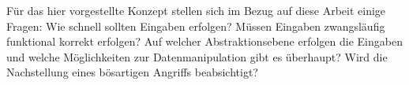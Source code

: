Für das hier vorgestellte Konzept stellen sich im Bezug auf diese Arbeit einige Fragen:
Wie schnell sollten Eingaben erfolgen? Müssen Eingaben zwangsläufig funktional korrekt erfolgen?
Auf welcher Abstraktionsebene erfolgen die Eingaben und welche Möglichkeiten zur Datenmanipulation
gibt es überhaupt? Wird die Nachstellung eines bösartigen Angriffs beabsichtigt?
